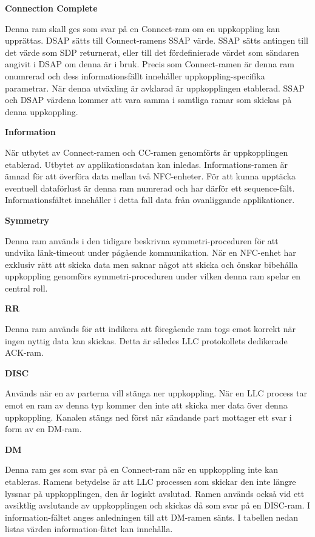 \documentclass[11pt]{article}
\begin{document}
\textbf{Connection Complete}


Denna ram skall ges som svar på en Connect-ram om en uppkoppling kan upprättas. DSAP sätts till Connect-ramens SSAP värde. SSAP sätts antingen till det värde som SDP returnerat, eller till det fördefinierade värdet som sändaren angivit i DSAP om denna är i bruk. Precis som Connect-ramen är denna ram onumrerad och dess informationsfällt innehåller uppkoppling-specifika parametrar. När denna utväxling är avklarad är uppkopplingen etablerad. SSAP och DSAP värdena kommer att vara samma i samtliga ramar som skickas på denna uppkoppling. 

\textbf{Information}


När utbytet av Connect-ramen och CC-ramen genomförts är uppkopplingen etablerad. Utbytet av applikationsdatan kan inledas. Informations-ramen är ämnad för att överföra data mellan två NFC-enheter. För att kunna upptäcka eventuell dataförlust är denna ram numrerad och har därför ett sequence-fält. Informationsfältet innehåller i detta fall data från ovanliggande applikationer.

\textbf{Symmetry}


Denna ram används i den tidigare beskrivna symmetri-proceduren för att undvika länk-timeout under pågående kommunikation. När en NFC-enhet har exklusiv rätt att skicka data men saknar något att skicka och önskar bibehålla uppkoppling genomförs symmetri-proceduren under vilken denna ram spelar en central roll.

\textbf{RR}


Denna ram används för att indikera att föregående ram togs emot korrekt när ingen nyttig data kan skickas. Detta är således LLC protokollets dedikerade ACK-ram.

\textbf{DISC}


Används när en av parterna vill stänga ner uppkoppling. När en LLC process tar emot en ram av denna typ kommer den inte att skicka mer data över denna uppkoppling. Kanalen stängs ned först när sändande part mottager ett svar i form av en DM-ram.

\textbf{DM}


Denna ram ges som svar på en Connect-ram när en uppkoppling inte kan etableras. Ramens betydelse är att LLC processen som skickar den inte längre lyssnar på uppkopplingen, den är logiskt avslutad. Ramen används också vid ett avsiktlig avslutande av uppkopplingen och skickas då som svar på en DISC-ram. I information-fältet anges anledningen till att DM-ramen sänts. I tabellen nedan listas värden information-fätet kan innehålla.
\end{document}
